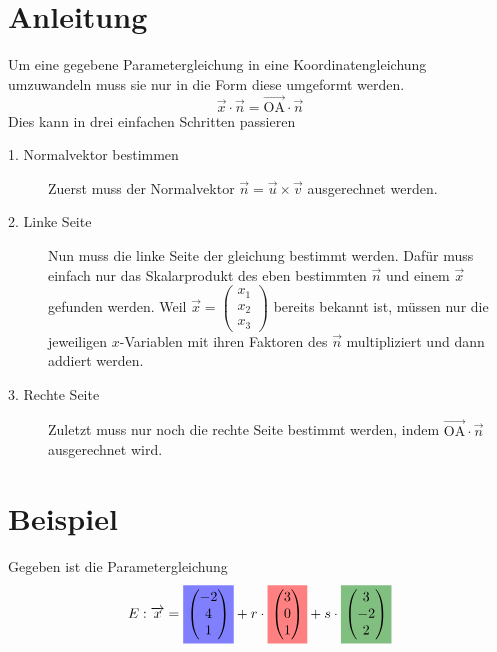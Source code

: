 \documentclass{article}
\begin{document}
 
\newcommand{\vect}[1]{\overrightarrow{#1}}
\newcommand{\vectp}[1]{\vect{\mathrm{#1}}}
 
\section*{Anleitung}
Um eine gegebene Parametergleichung in eine Koordinatengleichung umzuwandeln muss sie nur in die Form diese umgeformt werden.
\[
 \vect{x} \cdot \vect{n} = \vectp{OA} \cdot \vect{n} 
\]
Dies kann in drei einfachen Schritten passieren 
\begin{description}
 \item[1. Normalvektor bestimmen] Zuerst muss der Normalvektor $\vect{n} = \vect{u} \times \vect{v}$ ausgerechnet werden.
 \item[2. Linke Seite] Nun muss die linke Seite der gleichung bestimmt werden. Dafür muss einfach nur das Skalarprodukt des eben bestimmten $\vect{n}$ und einem $\vect{x}$ gefunden werden. Weil $\vect{x} = \begin{pmatrix} x_1 \\ x_2 \\ x_3 \end{pmatrix}$ bereits bekannt ist, müssen nur die jeweiligen $x$-Variablen mit ihren Faktoren des $\vect{n}$ multipliziert und dann addiert werden.
 \item[3. Rechte Seite] Zuletzt muss nur noch die rechte Seite bestimmt werden, indem $\vectp{OA} \cdot \vect{n}$ ausgerechnet wird.
\end{description} 
  
\section*{Beispiel}
Gegeben ist die Parametergleichung
\begin{equation}
 E: \vect{x} =
 \colorbox{blue!50}{$\begin{pmatrix} -2 \\ 4 \\ 1 \end{pmatrix}$}
 + r \cdot \colorbox{red!50}{$\begin{pmatrix} 3 \\ 0 \\ 1 \end{pmatrix}$}
 + s \cdot \colorbox{green!50!black!50}{$\begin{pmatrix} 3 \\ -2 \\ 2 \end{pmatrix}$}
\end{equation}
 
\end{document}
